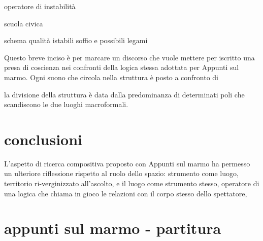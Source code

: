 operatore di instabilità

scuola civica



schema qualità istabili  soffio  e possibili legami








Questo breve inciso è per marcare un discorso che vuole mettere per iscritto una presa di coscienza nei confronti della logica stessa adottata per Appunti sul marmo.
Ogni suono che circola nella struttura è posto a confronto di

la divisione della struttura è data dalla predominanza di determinati poli che scandiscono  le due luoghi macroformali.

\part*{conclusioni}

L'aspetto di ricerca compositiva proposto con Appunti sul marmo ha permesso un ulteriore riflessione rispetto al ruolo dello spazio:
strumento come luogo, territorio ri-verginizzato all'ascolto, e il luogo come strumento stesso, operatore di una logica che chiama in gioco
le relazioni con il corpo stesso dello spettatore,

\part*{appunti sul marmo - partitura}
